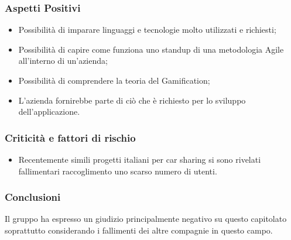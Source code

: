 \subsubsection{Aspetti Positivi}
\begin{itemize}
	\item Possibilità di imparare linguaggi e tecnologie molto utilizzati e richiesti;
	\item Possibilità di capire come funziona uno standup di una metodologia Agile all'interno di un'azienda;
	\item Possibilità di comprendere la teoria del Gamification;
	\item L'azienda fornirebbe parte di ciò che è richiesto per lo sviluppo dell'applicazione.
\end{itemize}
\subsubsection{Criticità e fattori di rischio}
\begin{itemize}
	\item Recentemente simili progetti italiani per car sharing si sono rivelati fallimentari raccoglimento uno scarso numero di utenti.
\end{itemize}
\subsubsection{Conclusioni}
Il gruppo ha espresso un giudizio principalmente negativo su questo capitolato soprattutto considerando i fallimenti dei altre compagnie in questo campo.